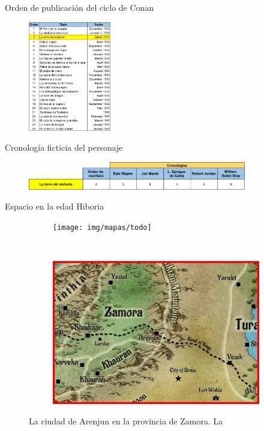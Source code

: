 \begin{frame}{Orden de publicación del ciclo de Conan}
\begin{figure}[htb]
  \centering
  \includegraphics[width=0.32\textwidth]{img/OrdenPublicacion}
\end{figure}
\end{frame}

\begin{frame}{Cronología ficticia del personaje}
\begin{figure}[htb]
  \centering
  \includegraphics[width=0.85\textwidth]{img/Cronollogias}
\end{figure}
\end{frame}

\begin{frame}{Espacio en la edad Hiboria}
\begin{figure}[htp]
 \centering
 \begin{subfigure}[b]{0.48\textwidth}
   \texttt{[image: img/mapas/todo]}
 \end{subfigure}
~
 \begin{subfigure}[b]{0.48\textwidth}
   \includegraphics[width=\textwidth]{img/mapas/inset}
 \end{subfigure}
 \caption{La ciudad de Arenjun en la provincia de Zamora. La }
 \end{figure}
\end{frame}

